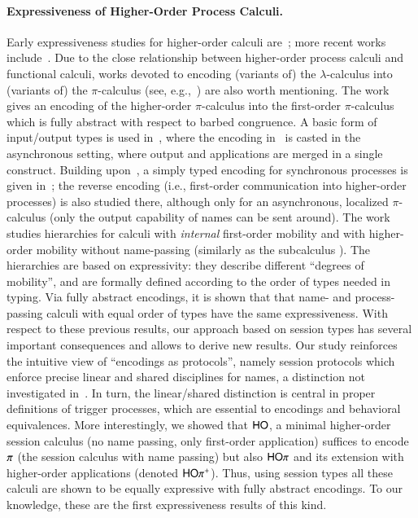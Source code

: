 \paragraph{Expressiveness of Higher-Order Process Calculi.}
Early expressiveness studies for higher-order calculi are~\cite{Tho90,San923}; 
more recent works include~\cite{BundgaardHG06,DBLP:conf/icalp/LanesePSS10,DBLP:journals/iandc/LanesePSS11,XuActa2012,DBLP:conf/wsfm/XuYL13}.
Due to the close relationship between higher-order process calculi and functional calculi, 
works devoted to encoding (variants of) the $\lambda$-calculus into (variants of) the $\pi$-calculus (see, e.g.,~\cite{San92,DBLP:journals/tcs/Fu99,DBLP:journals/iandc/YoshidaBH04,BHY,DBLP:conf/concur/SangiorgiX14}) are also worth mentioning.
The work~\cite{San923} gives an encoding of the higher-order $\pi$-calculus
into the first-order $\pi$-calculus which is fully abstract with respect to barbed congruence. 
A basic form of input/output types is used in~\cite{DBLP:journals/tcs/Sangiorgi01}, where the encoding in~\cite{San923} is casted in the asynchronous setting, where output and applications are merged in a single construct. Building upon~\cite{DBLP:journals/tcs/Sangiorgi01}, 
a simply typed encoding for synchronous processes is given in~\cite{SaWabook}; the reverse encoding (i.e.,  first-order communication into higher-order processes) is also studied there, although only for an asynchronous, localized $\pi$-calculus (only the output capability of names can be sent around).
The work~\cite{San96int} studies hierarchies for calculi with \emph{internal} first-order mobility and 
with higher-order mobility without name-passing (similarly as the subcalculus \HO). 
The hierarchies are based on expressivity: they describe different ``degrees of mobility'', and are 
formally defined according to the order of types needed in typing.
Via fully abstract encodings, it is shown that that name- and process-passing calculi with equal order of types have the same expressiveness.
With respect to these previous results, our approach based on session types 
has several important consequences and allows to derive new results.  Our study reinforces the intuitive view of ``encodings as protocols'', namely session protocols which enforce precise linear and shared disciplines for names, a distinction not investigated in~\cite{San923,DBLP:journals/tcs/Sangiorgi01}. 
In turn, the linear/shared distinction is central in proper definitions of trigger processes, which are essential to encodings and behavioral equivalences.
More interestingly, we showed that $\mathsf{HO}$, a  minimal higher-order session calculus (no name passing, only first-order application) suffices to encode $\pi$ (the session calculus with name passing) but also 
$\mathsf{HO}\pi$  and 
its extension  with higher-order applications (denoted $\mathsf{HO}\pi^{\mathsf +}$). 
Thus, using session types all these calculi are shown to be equally expressive with fully abstract encodings.
To our knowledge, these are the first expressiveness results of this kind.

